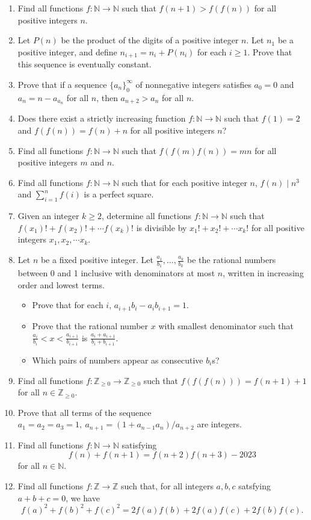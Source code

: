 \documentclass{article}
\newcommand\Nn{\mathbb{N}}
\newcommand\Zz{\mathbb{Z}}
\begin{document}
\begin{enumerate}
  \item Find all functions $f:\Nn\to\Nn$ such that $f(n+1)>f(f(n))$ for all
    positive integers $n$.
  \item Let $P(n)$ be the product of the digits of a positive integer $n$.
    Let $n_1$ be a positive integer, and define $n_{i+1}=n_i+P(n_i)$ for each
    $i\ge 1$. Prove that this sequence is eventually constant.
  \item Prove that if a sequence $\{a_n\}_0^\infty$ of nonnegative integers satisfies
    $a_0=0$ and $a_n=n-a_{a_n}$ for all $n$, then $a_{n+2}>a_n$ for all $n$.
  \item Does there exist a strictly increasing function $f:\Nn\to\Nn$ such that
    $f(1)=2$ and $f(f(n))=f(n)+n$ for all positive integers $n$?
  \item Find all functions $f:\Nn\to\Nn$ such that $f(f(m)f(n))=mn$ for all
    positive integers $m$ and $n$.
  \item Find all functions $f:\mathbb N\to\mathbb N$ such that for each positive
    integer $n$, $f(n)\mid n^3$ and $\displaystyle\sum_{i=1}^n f(i)$ is a perfect
    square.
  \item Given an integer $k\geq 2$, determine all functions $f:\Nn\to\Nn$
    such that $f(x_1)!+f(x_2)!+\cdots f(x_k)!$
    is divisible by $x_1!+x_2!+\cdots x_k!$ for all positive integers
    $x_1,x_2,\cdots x_k$.
  \item Let $n$ be a fixed positive integer. Let
    $\frac{a_1}{b_1},\ldots,\frac{a_k}{b_k}$ be the rational numbers between 0
    and 1 inclusive with denominators at most $n$, written in increasing order
    and lowest terms.
    \begin{itemize}
      \item Prove that for each $i$, $a_{i+1}b_i-a_i b_{i+1}=1$.
      \item Prove that the rational number $x$ with smallest denominator such
        that $\frac{a_i}{b_i}<x<\frac{a_{i+1}}{b_{i+1}}$ is
        $\frac{a_i+a_{i+1}}{b_i+b_{i+1}}$. 
      \item Which pairs of numbers appear as consecutive $b_i$s?
    \end{itemize}
  \item Find all functions $f:\Zz_{\ge 0}\to \Zz_{\ge 0}$ such that
    $f(f(f(n)))=f(n+1)+1$ for all $n\in\Zz_{\ge 0}$.
  \item Prove that all terms of the sequence $a_1=a_2=a_3=1,\
    a_{n+1}=(1+a_{n-1}a_n)/a_{n+2}$ are integers.
  \item Find all functions $f:\mathbb N\to\mathbb N$ satisfying 
    \[f(n)+f(n+1)=f(n+2)f(n+3)-2023\]
    for all $n\in\mathbb N$.
  \item Find all functions $f:\Zz\to\Zz$ such that, for all integers $a,b,c$
    satsfying $a+b+c=0$, we have
    \[f(a)^2+f(b)^2+f(c)^2=2f(a)f(b)+2f(a)f(c)+2f(b)f(c).\]
\end{enumerate}
\newpage
\end{document}
